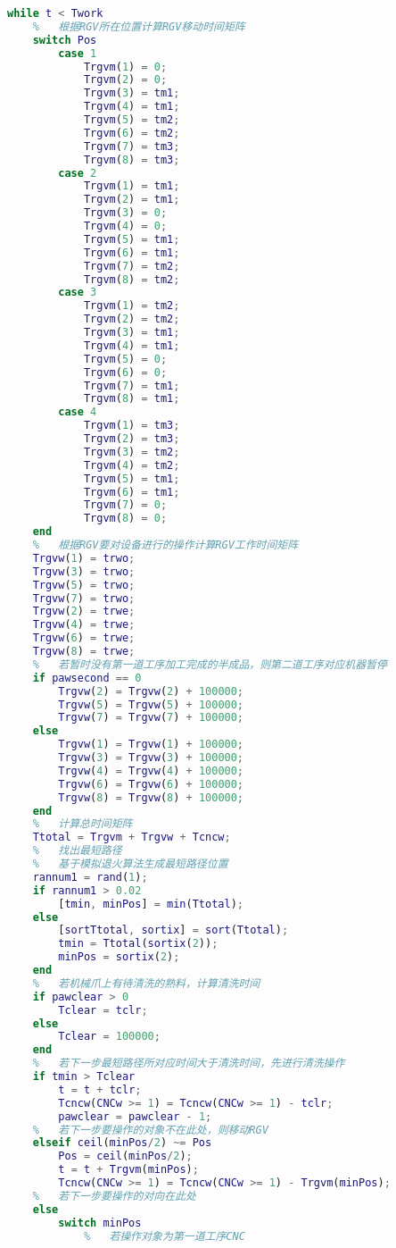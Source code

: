 \documentclass[no-math,withoutpreface,bwprint]{cumcmthesis} %
\numberwithin{equation}{section}
\numberwithin{figure}{section}
\numberwithin{table}{section}
\begin{document}
\begin{lstlisting}[language=matlab]
while t < Twork
    %   根据RGV所在位置计算RGV移动时间矩阵
    switch Pos
        case 1
            Trgvm(1) = 0;
          	Trgvm(2) = 0;
            Trgvm(3) = tm1;
           	Trgvm(4) = tm1;
         	Trgvm(5) = tm2;
           	Trgvm(6) = tm2;
          	Trgvm(7) = tm3;
           	Trgvm(8) = tm3;
       	case 2
           	Trgvm(1) = tm1;
           	Trgvm(2) = tm1;
         	Trgvm(3) = 0;
          	Trgvm(4) = 0;
           	Trgvm(5) = tm1;
          	Trgvm(6) = tm1;
           	Trgvm(7) = tm2;
           	Trgvm(8) = tm2;               
        case 3
           	Trgvm(1) = tm2;
          	Trgvm(2) = tm2;
          	Trgvm(3) = tm1;
         	Trgvm(4) = tm1;
          	Trgvm(5) = 0;
           	Trgvm(6) = 0;
          	Trgvm(7) = tm1;
           	Trgvm(8) = tm1;
     	case 4
         	Trgvm(1) = tm3;
          	Trgvm(2) = tm3;
           	Trgvm(3) = tm2;
          	Trgvm(4) = tm2;
           	Trgvm(5) = tm1;
          	Trgvm(6) = tm1;
        	Trgvm(7) = 0;
           	Trgvm(8) = 0;        
    end
    %   根据RGV要对设备进行的操作计算RGV工作时间矩阵
    Trgvw(1) = trwo;
	Trgvw(3) = trwo;
    Trgvw(5) = trwo;
	Trgvw(7) = trwo;
	Trgvw(2) = trwe;
	Trgvw(4) = trwe;
	Trgvw(6) = trwe;
	Trgvw(8) = trwe;
    %   若暂时没有第一道工序加工完成的半成品，则第二道工序对应机器暂停
    if pawsecond == 0
        Trgvw(2) = Trgvw(2) + 100000;
        Trgvw(5) = Trgvw(5) + 100000;
        Trgvw(7) = Trgvw(7) + 100000;
    else
        Trgvw(1) = Trgvw(1) + 100000;
        Trgvw(3) = Trgvw(3) + 100000;
        Trgvw(4) = Trgvw(4) + 100000;
        Trgvw(6) = Trgvw(6) + 100000;
        Trgvw(8) = Trgvw(8) + 100000;
    end
    %   计算总时间矩阵
    Ttotal = Trgvm + Trgvw + Tcncw;
    %   找出最短路径
    %   基于模拟退火算法生成最短路径位置
    rannum1 = rand(1);
    if rannum1 > 0.02
        [tmin, minPos] = min(Ttotal);
    else
        [sortTtotal, sortix] = sort(Ttotal);
        tmin = Ttotal(sortix(2));
        minPos = sortix(2);
    end
    %   若机械爪上有待清洗的熟料，计算清洗时间
    if pawclear > 0
        Tclear = tclr;
    else
        Tclear = 100000;
    end
    %   若下一步最短路径所对应时间大于清洗时间，先进行清洗操作
    if tmin > Tclear
        t = t + tclr;
        Tcncw(CNCw >= 1) = Tcncw(CNCw >= 1) - tclr;
        pawclear = pawclear - 1;
    %   若下一步要操作的对象不在此处，则移动RGV
    elseif ceil(minPos/2) ~= Pos
        Pos = ceil(minPos/2);
        t = t + Trgvm(minPos);
        Tcncw(CNCw >= 1) = Tcncw(CNCw >= 1) - Trgvm(minPos);
    %   若下一步要操作的对向在此处
    else
        switch minPos
            %   若操作对象为第一道工序CNC

\end{lstlisting}
\end{document}

